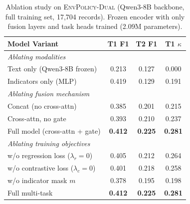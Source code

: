 \begin{table}[t]
\centering
\small
\begin{tabular}{lccc}
\toprule
\textbf{Model Variant} & \textbf{T1 F1} & \textbf{T2 F1} & \textbf{T1 $\kappa$} \\
\midrule
\multicolumn{4}{l}{\textit{Ablating modalities}} \\
Text only (Qwen3-8B frozen)     & 0.213 & 0.127 & 0.000 \\
Indicators only (MLP)           & 0.419 & 0.129 & 0.191 \\
\midrule
\multicolumn{4}{l}{\textit{Ablating fusion mechanism}} \\
Concat (no cross-attn)          & 0.385 & 0.201 & 0.215 \\
Cross-attn, no gate             & 0.393 & 0.210 & 0.237 \\
Full model (cross-attn + gate)  & \textbf{0.412} & \textbf{0.225} & \textbf{0.281} \\
\midrule
\multicolumn{4}{l}{\textit{Ablating training objectives}} \\
w/o regression loss ($\lambda_r{=}0$)  & 0.405 & 0.212 & 0.264 \\
w/o contrastive loss ($\lambda_c{=}0$) & 0.401 & 0.218 & 0.258 \\
w/o indicator mask $m$                 & 0.378 & 0.195 & 0.198 \\
Full multi-task                        & \textbf{0.412} & \textbf{0.225} & \textbf{0.281} \\
\bottomrule
\end{tabular}
\caption{Ablation study on \textsc{EnvPolicy-Dual} (Qwen3-8B backbone, full training set, 17,704 records). Frozen encoder with only fusion layers and task heads trained (2.09M parameters).}
\label{tab:ablation}
\end{table}
